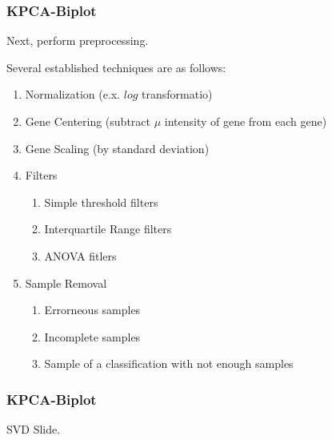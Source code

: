 \documentclass[serif]{beamer}
\begin{document}
	\begin{frame}
		\frametitle{KPCA-Biplot}
		Next, perform preprocessing. \newline

		Several established techniques are as follows:
			\begin{enumerate}
				\item Normalization (e.x. $log$ transformatio)
				\item Gene Centering (subtract $\mu$ intensity of gene from each gene)
				\item Gene Scaling (by standard deviation)
				\item Filters
					\begin{enumerate}
						\item Simple threshold filters
						\item Interquartile Range filters
						\item ANOVA fitlers
					\end{enumerate}
				\item Sample Removal
					\begin{enumerate}
						\item Errorneous samples
						\item Incomplete samples
						\item Sample of a classification with not enough samples
					\end{enumerate}
			\end{enumerate}		

		\note
		{

		}

	\end{frame}

	\begin{frame}
		\frametitle{KPCA-Biplot}

		SVD Slide.
				
	\end{frame}
\end{document}
